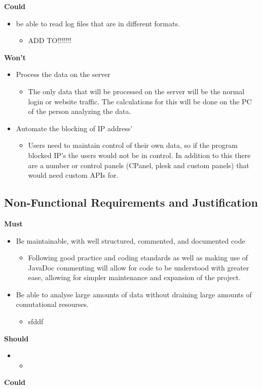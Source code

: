 \textbf{Could}
\begin{itemize}
\item be able to read log files that are in different formats.
    \begin{itemize}
        \item ADD TO!!!!!!!
    \end{itemize}
    \end{itemize}
\textbf{Won't}
\begin{itemize}
    \item Process the data on the server
    \begin{itemize}
        \item The only data that will be processed on the server will be the normal login or website traffic. The calculations for this will be done on the PC of the person analyzing the data.
    \end{itemize}
    \item Automate the blocking of IP address' 
    \begin{itemize}
        \item Users need to maintain control of their own data, so if the program blocked IP's the users would not be in control. In addition to this there are a number or control panels (CPanel, plesk and custom panels) that would need custom APIs for.
    \end{itemize}
\end{itemize}

\subsection{Non-Functional Requirements and Justification}
\textbf{Must}
\begin{itemize}
    \item Be maintainable, with well structured, commented, and documented code
    \begin{itemize}
        \item Following good practice and coding standards as well as making use of JavaDoc commenting will allow for code to be understood with greater ease, allowing for simpler maintenance and expansion of the project. 
    \end{itemize}
    \item Be able to analyse large amounts of data without draining large amounts of comutational resourses.
    \begin{itemize}
        \item sfddf
    \end{itemize}
\end{itemize}
\textbf{Should}
\begin{itemize}
    \item 
    \begin{itemize}
        \item 
    \end{itemize}
\end{itemize}
\textbf{Could}

